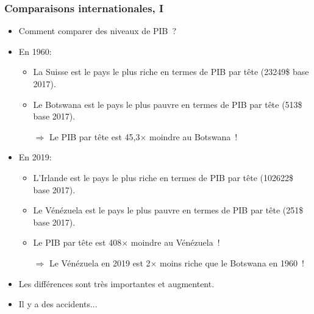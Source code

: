 \documentclass[10pt,notheorems]{beamer}
\theoremstyle{plain}
\theoremstyle{definition} %
\begin{document}
\begin{frame}
  \frametitle{Comparaisons internationales, I}

  \bigskip

  \begin{itemize}

  \item Comment comparer des niveaux de PIB~?\newline

  \item En 1960:

    \begin{itemize}
    \item La Suisse est le pays le plus riche en termes de PIB par tête (23249\$ base 2017).
    \item Le Botswana est le pays le plus pauvre en termes de PIB par tête (513\$ base 2017).
    \item[$\Rightarrow$] Le PIB par tête est 45,3$\times$ moindre au Botswana~!\newline
    \end{itemize}

  \item En 2019:

    \begin{itemize}
    \item L'Irlande est le pays le plus riche en termes de PIB par tête (102622\$ base 2017).
    \item Le Vénézuela est le pays le plus pauvre en termes de PIB par tête (251\$ base 2017).
    \item Le PIB par tête est 408$\times$ moindre au Vénézuela~!
    \item[$\Rightarrow$] Le Vénézuela en 2019 est 2$\times$ moins riche que le Botswana en 1960~! \newline
    \end{itemize}

  \item Les différences sont très importantes et augmentent.\newline

  \item Il y a des accidents...
    
  \end{itemize}

\end{frame}
\end{document}
